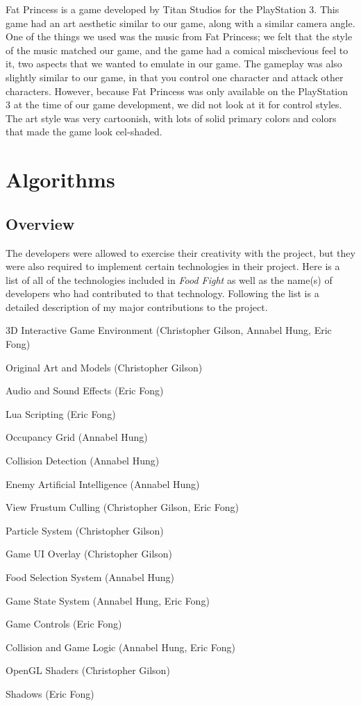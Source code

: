 \documentclass{article}
\begin{document}
Fat Princess is a game developed by Titan Studios for the {PlayStation
3}.\cite{fat} This game had an art aesthetic similar to our game, along with a
similar camera angle. One of the things we used was the music from Fat Princess;
we felt that the style of the music matched our game, and the game had a comical
mischevious feel to it, two aspects that we wanted to emulate in our game. The
gameplay was also slightly similar to our game, in that you control one
character and attack other characters. However, because Fat Princess was only
available on the {PlayStation 3} at the time of our game development, we did not
look at it for control styles. The art style was very cartoonish, with lots of
solid primary colors and colors that made the game look cel-shaded.

\section{Algorithms}

\subsection{Overview}
The developers were allowed to exercise their creativity with the project, but they were also required to implement certain technologies in their project. Here is a list of all of the technologies included in \textit{Food Fight} as well as the name(s) of developers who had contributed to that technology. Following the list is a detailed description of my major contributions to the project.

\begin{itemize*}
    \item 3D Interactive Game Environment (Christopher Gilson, Annabel Hung, Eric Fong)
    \item Original Art and Models (Christopher Gilson)
    \item Audio and Sound Effects (Eric Fong)
    \item Lua Scripting (Eric Fong)
    \item Occupancy Grid (Annabel Hung)
    \item Collision Detection (Annabel Hung)
    \item Enemy Artificial Intelligence (Annabel Hung)
    \item View Frustum Culling (Christopher Gilson, Eric Fong)
    \item Particle System (Christopher Gilson)
    \item Game UI Overlay (Christopher Gilson)
    \item Food Selection System (Annabel Hung)
    \item Game State System (Annabel Hung, Eric Fong)
    \item Game Controls (Eric Fong)
    \item Collision and Game Logic (Annabel Hung, Eric Fong)
    \item OpenGL Shaders (Christopher Gilson)
    \item Shadows (Eric Fong)
\end{itemize*}
\end{document}
